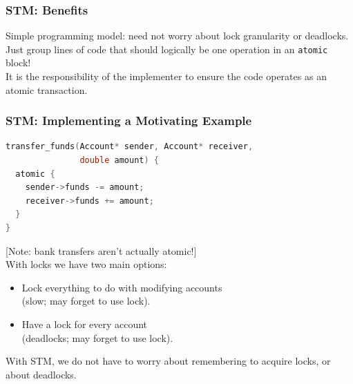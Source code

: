 \begin{frame}
  \frametitle{STM: Benefits}


    Simple programming model: need not worry about lock
      granularity or deadlocks.\\[1em]

    Just group lines of code that should logically be one operation
      in an {\tt atomic} block!\\[1em]

    It is the responsibility of the implementer to ensure the code
      operates as an atomic transaction.

\end{frame}

\begin{frame}[fragile]
  \frametitle{STM: Implementing a Motivating Example}


  \begin{lstlisting}[language=C]
transfer_funds(Account* sender, Account* receiver,
               double amount) {
  atomic {
    sender->funds -= amount;
    receiver->funds += amount;
  }
}
  \end{lstlisting}
  [Note: bank transfers aren't actually atomic!]\\[1em]

    With locks we have two main options:
      \begin{itemize}
        \item Lock everything to do with modifying accounts \\ 
\qquad (slow; may forget to use lock).
        \item Have a lock for every account \\ 
\qquad (deadlocks; may forget to use lock).
      \end{itemize}
    With STM, we do not have to worry about remembering to acquire locks,
      or about deadlocks.

\end{frame}

